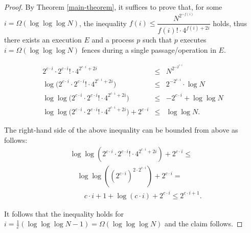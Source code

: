 \begin{proof}
	By Theorem \ref{main-theorem}, it suffices to prove that, for some $i = \Omega(\log \log \log N)$, the inequality $f(i) \leq \dfrac{N^{2^{-f(i)}}} {f(i)! \cdot 4^{f(i)+2i}}$ holds, thus there exists an execution $E$ and a process $p$ such that $p$ executes $i = \Omega(\log \log \log N)$ fences during a single passage/operation in $E$.
	
	\begin{equation*}
	\begin{array}{rcl}
	2^{c \cdot i} \cdot 2^{c \cdot i}! \cdot 4^{2^{c \cdot i} +2i} & \leq & {N^{2^{-2^{c \cdot i}}}} \\
	\log \big(2^{c \cdot i} \cdot 2^{c \cdot i}! \cdot 4^{2^{c \cdot i} +2i}\big) & \leq & 2^{-2^{c \cdot i}} \cdot \log N \\
	\log \log \big(2^{c \cdot i} \cdot 2^{c \cdot i}! \cdot 4^{2^{c \cdot i} +2i}\big) & \leq & -2^{c \cdot i} + \log \log N \\
	\log \log \big(2^{c \cdot i} \cdot 2^{c \cdot i}! \cdot 4^{2^{c \cdot i} +2i}\big) + 2^{c \cdot i} & \leq & \log \log N.
	\end{array}
	\end{equation*}

The right-hand side of the above inequality can be bounded from above as follows:
\begin{align*}
& \log \log(2^{c \cdot i} \cdot 2^{c \cdot i}! \cdot 4^{2^{c \cdot i} +2i}) + 2^{c \cdot i} \leq \\
& \quad \log \log((2^{c \cdot i})^{2 \cdot 2^{c \cdot i}}) + 2^{c \cdot i} = \\
& \qquad c \cdot i + 1 + \log(c \cdot i) + 2^{c \cdot i} \leq  2^{c \cdot i + 1}.
\end{align*}
	
It follows that the inequality holds for $i = \frac{1}{c}(\log \log \log N - 1) = \Omega(\log \log \log N)$ and the claim follows.
\end{proof}


